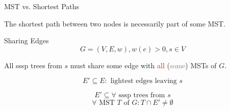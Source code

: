 
\begin{frame}{}
  \centerline{}
\end{frame}

\begin{frame}{}
  \begin{exampleblock}{MST vs. Shortest Paths }
    \centerline{\xmark The shortest path between two nodes is necessarily part of some MST.}
  \end{exampleblock}

\end{frame}

\begin{frame}{}
  \begin{exampleblock}{Sharing Edges }
    \[
      G = (V, E, w), w(e) > 0, s \in V
    \]

    \centerline{All sssp trees from $s$ must share some edge with \textcolor{red}{all} {\small (\textcolor{gray}{some})} MSTs of $G$.}
  \end{exampleblock}

  \pause
  \[
    E' \subseteq E: \text{ lightest edges leaving } s
  \]

  \pause
  \[
    E' \subseteq \forall \text{ sssp trees from } s
  \]
  \[
    \forall \text{ MST } T \text{ of } G: T \cap E' \neq \emptyset
  \]
\end{frame}
